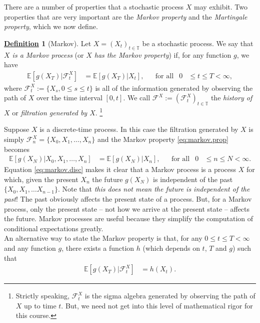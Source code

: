 \documentclass[12pt]{book}
\numberwithin{equation}{chapter}
\theoremstyle{plain}
\numberwithin{theorem}{section}
\theoremstyle{definition}
\newtheorem{definition}[theorem]{\underline{Definition}}
\numberwithin{exercise}{chapter}
\newcommand{\<}{\langle}
\renewcommand{\>}{\rangle}
\renewcommand{\(}{\left(}
\renewcommand{\)}{\right)}
\renewcommand{\[}{\left[}
\renewcommand{\]}{\right]}
\newcommand\Eb{\mathds{E}}
\newcommand\Fc{\mathscr{F}}
\theoremstyle{definition}
\numberwithin{question}{section}
\begin{document}
\noindent
There are a number of properties that a stochastic process $X$ may exhibit.  Two properties that are very important are the \textit{Markov property} and the \textit{Martingale property}, which we now define.

\begin{definition}[Markov]
\label{def:markov}
Let $X = (X_t)_{t \in \mathds{T}}$ be a stochastic process.
We say that \textit{$X$ is a Markov process} (or \textit{$X$ has the Markov property}) if, for any function $g$, we have
\begin{align}
\Eb[ g(X_T) | \Fc_t^X ]
	&=	\Eb[ g(X_T) | X_t ] , &
	&\text{for all}&
0
	&\leq t \leq T < \infty , \label{eq:markov.prop}
\end{align}
where $\Fc_t^X := \{ X_s, 0 \leq s \leq t \}$ is all of the information generated by observing the path of $X$ over the time interval $[0,t]$.
We call $\Fc^X := (\Fc_t^X)_{ t \in \mathds{T} }$ the \textit{history of $X$} or \textit{filtration generated by $X$}.
\footnote{Strictly speaking, $\Fc_t^X$ is the sigma algebra generated by observing the path of $X$ up to time $t$.  But, we need not get into this level of mathematical rigor for this course.}
\end{definition}

\noindent
Suppose $X$ is a discrete-time process.  In this case the filtration generated by $X$ is simply $\Fc_n^X = \{ X_0, X_1, \ldots, X_n \}$ and the Markov property \eqref{eq:markov.prop} becomes
\begin{align}
\Eb[ g(X_N) | X_0, X_1, \ldots, X_n ]
	&=	\Eb[ g(X_N) | X_n ] , &
	&\text{for all}&
0
	&\leq n \leq N < \infty . \label{eq:markov.disc}
\end{align}
Equation \eqref{eq:markov.disc} makes it clear that a Markov process is a process $X$ for which, given the  present $X_n$ the future $g(X_N)$ is independent of the past $\{X_0, X_1, \ldots X_{n-1} \}$.
Note that \textit{this does not mean the future is independent of the past}!    The past obviously affects the present state of a process.  But, for a Markov process, only the present state -- not how we arrive at the present state -- affects the future.  Markov processes are useful because they simplify the computation of conditional expectations greatly.
\\[0.5em]
An alternative way to state the Markov property is that, for any $0 \leq t \leq T < \infty$ and any function $g$, there exists a function $h$ (which depends on $t$, $T$ and $g$) such that
\begin{align}
\Eb[ g(X_T) | \Fc_t^X ]
	&= h(X_t) .
\end{align}
\end{document}
